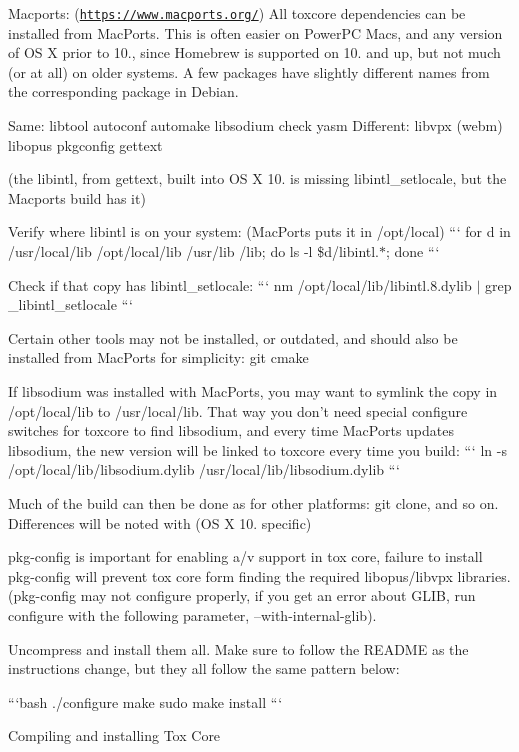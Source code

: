 Macports\+: (\href{https://www.macports.org/}{\tt https\+://www.\+macports.\+org/}) All toxcore dependencies can be installed from Mac\+Ports. This is often easier on Power\+P\+C Macs, and any version of O\+S X prior to 10., since Homebrew is supported on 10. and up, but not much (or at all) on older systems. A few packages have slightly different names from the corresponding package in Debian.

Same\+: libtool autoconf automake libsodium check yasm Different\+: libvpx (webm) libopus pkgconfig gettext

(the libintl, from gettext, built into O\+S X 10. is missing libintl\+\_\+setlocale, but the Macports build has it)

Verify where libintl is on your system\+: (Mac\+Ports puts it in /opt/local) ``` for d in /usr/local/lib /opt/local/lib /usr/lib /lib; do ls -\/l \$d/libintl.$\ast$; done ```

Check if that copy has libintl\+\_\+setlocale\+: ``` nm /opt/local/lib/libintl.8.\+dylib $\vert$ grep \+\_\+libintl\+\_\+setlocale ```

Certain other tools may not be installed, or outdated, and should also be installed from Mac\+Ports for simplicity\+: git cmake

If libsodium was installed with Mac\+Ports, you may want to symlink the copy in /opt/local/lib to /usr/local/lib. That way you don't need special configure switches for toxcore to find libsodium, and every time Mac\+Ports updates libsodium, the new version will be linked to toxcore every time you build\+: ``` ln -\/s /opt/local/lib/libsodium.dylib /usr/local/lib/libsodium.dylib ```

Much of the build can then be done as for other platforms\+: git clone, and so on. Differences will be noted with (O\+S X 10. specific)

pkg-\/config is important for enabling a/v support in tox core, failure to install pkg-\/config will prevent tox core form finding the required libopus/libvpx libraries. (pkg-\/config may not configure properly, if you get an error about G\+L\+I\+B, run configure with the following parameter, --with-\/internal-\/glib).

Uncompress and install them all. Make sure to follow the R\+E\+A\+D\+M\+E as the instructions change, but they all follow the same pattern below\+:

```bash ./configure make sudo make install ```

Compiling and installing Tox Core

